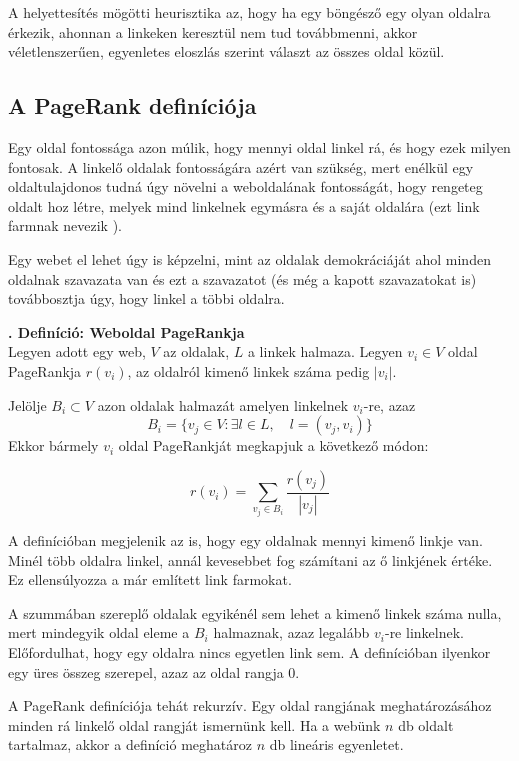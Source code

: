 \documentclass[12pt,a4paper]{article}
\newcounter{definicioszam}
\newenvironment{definicio}[1]
{{\medskip}\noindent \stepcounter{definicioszam}
{\bfseries{\thedefinicioszam. Definíció: #1\\[1ex]}}}{\bigskip }
\begin{document}
\vspace{0.5 cm}

A helyettesítés mögötti heurisztika az, hogy ha egy böngésző egy olyan oldalra érkezik, ahonnan a linkeken keresztül nem tud továbbmenni, akkor véletlenszerűen, egyenletes eloszlás szerint választ az összes oldal közül.

\subsection{A PageRank definíciója}

Egy oldal fontossága azon múlik, hogy mennyi oldal linkel rá, és hogy ezek milyen fontosak. A linkelő oldalak fontosságára azért van szükség, mert enélkül egy oldaltulajdonos tudná úgy növelni a weboldalának fontosságát, hogy rengeteg oldalt hoz létre, melyek mind linkelnek egymásra és a saját oldalára (ezt link farmnak nevezik \cite{lang}).

Egy webet el lehet úgy is képzelni, mint az oldalak demokráciáját ahol minden oldalnak szavazata van és ezt a szavazatot (és még a kapott szavazatokat is) továbbosztja úgy, hogy linkel a többi oldalra.

\begin{definicio}{Weboldal PageRankja}
	Legyen adott egy web, $V$ az oldalak, $L$ a linkek halmaza.
	Legyen $v_i \in V$ oldal PageRankja $r(v_i)$, az oldalról kimenő linkek száma pedig $ |v_i| $. 
	
	Jelölje $B_i \subset V$ azon oldalak halmazát amelyen linkelnek $v_i$-re, azaz
	\[B_i = \{ v_j \in V: \exists l \in L, \quad l = (v_j,v_i) \} \]
	Ekkor bármely $v_i$ oldal PageRankját megkapjuk a következő módon:
	
	\[ r(v_i) = \sum_{v_j \in B_i} \frac{r(v_j)}{ |v_j| } \]
\end{definicio}

A definícióban megjelenik az is, hogy egy oldalnak mennyi kimenő linkje van. Minél több oldalra linkel, annál kevesebbet fog számítani az ő linkjének értéke. Ez ellensúlyozza a már említett link farmokat.

A szummában szereplő oldalak egyikénél sem lehet a kimenő linkek száma nulla, mert mindegyik oldal eleme a $B_i$ halmaznak, azaz legalább $v_i$-re linkelnek. Előfordulhat, hogy egy oldalra nincs egyetlen link sem. A definícióban ilyenkor egy üres összeg szerepel, azaz az oldal rangja 0.

A PageRank definíciója tehát rekurzív. Egy oldal rangjának meghatározásához minden rá linkelő oldal rangját ismernünk kell. Ha a webünk $n$ db oldalt tartalmaz, akkor a definíció meghatároz $n$ db lineáris egyenletet.
\end{document}
